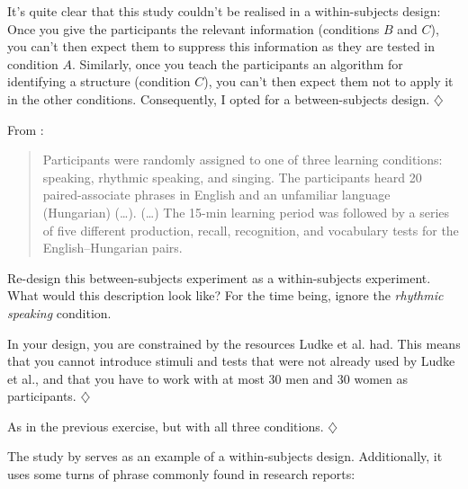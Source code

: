 \documentclass[a4paper]{tufte-book}\usepackage[]{graphicx}\usepackage[]{xcolor}
\newcommand*{\parend}[1][$\diamondsuit$]{%
\leavevmode\unskip\penalty9999 \hbox{}\nobreak\hfill
    \quad\hbox{#1}%
}
\begin{document}
  It's quite clear that this study couldn't be realised in a within-subjects design:
  Once you give the participants the relevant information (conditions $B$ and $C$), 
  you can't then expect them to suppress this information as they are tested in condition $A$.
  Similarly, once you teach the participants an algorithm for identifying a structure (condition $C$),
  you can't then expect them not to apply it in the other conditions.
  Consequently, I opted for a between-subjects design.
\parend

From \citet{Ludke2014}:
 \begin{quote}
Participants were randomly assigned to one of three learning conditions:
speaking, rhythmic speaking, and singing. The participants heard 20 paired-associate
phrases in English and an unfamiliar language (Hungarian) (\dots).
(\dots) The 15-min learning period was followed by a series of five different production,
recall, recognition, and vocabulary tests for the English--Hungarian pairs.
\end{quote}
Re-design this between-subjects experiment as a within-subjects experiment.
What would this description look like? For the time being, ignore the \textit{rhythmic speaking} condition.

In your design, you are constrained by the resources Ludke et al. had. This means that
you cannot introduce stimuli and tests that were not already used by Ludke et al., and
that you have to work with at most 30 men and 30 women as participants.
\parend

As in the previous exercise, but with all three conditions.
\parend


The study by \citet{Kang2013} serves as an example of a within-subjects design. 
Additionally, it uses some turns of phrase commonly found in research reports:
\end{document}
